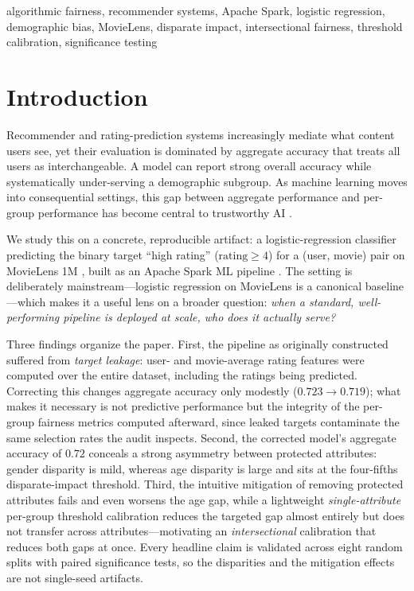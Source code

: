 \documentclass[conference]{IEEEtran}
\begin{document}
\begin{IEEEkeywords}
algorithmic fairness, recommender systems, Apache Spark, logistic regression,
demographic bias, MovieLens, disparate impact, intersectional fairness,
threshold calibration, significance testing
\end{IEEEkeywords}

\section{Introduction}
Recommender and rating-prediction systems increasingly mediate what content users
see, yet their evaluation is dominated by aggregate accuracy that treats all users
as interchangeable. A model can report strong overall accuracy while systematically
under-serving a demographic subgroup. As machine learning moves into consequential
settings, this gap between aggregate performance and per-group performance has
become central to trustworthy AI \cite{mehrabi2021survey,barocas2016big}.

We study this on a concrete, reproducible artifact: a logistic-regression classifier
predicting the binary target ``high rating'' ($\text{rating}\geq 4$) for a
(user, movie) pair on MovieLens 1M \cite{harper2015movielens}, built as an Apache
Spark ML pipeline \cite{meng2016mllib,zaharia2016spark}. The setting is deliberately
mainstream---logistic regression on MovieLens is a canonical baseline---which makes
it a useful lens on a broader question: \emph{when a standard, well-performing
pipeline is deployed at scale, who does it actually serve?}

Three findings organize the paper. First, the pipeline as originally constructed
suffered from \emph{target leakage}: user- and movie-average rating features were
computed over the entire dataset, including the ratings being predicted. Correcting
this changes aggregate accuracy only modestly ($0.723\rightarrow0.719$); what makes
it necessary is not predictive performance but the integrity of the per-group
fairness metrics computed afterward, since leaked targets contaminate the same
selection rates the audit inspects. Second, the corrected model's aggregate accuracy
of $0.72$ conceals a strong asymmetry between protected attributes: gender disparity
is mild, whereas age disparity is large and sits at the four-fifths disparate-impact
threshold. Third, the intuitive mitigation of removing protected attributes fails
and even worsens the age gap, while a lightweight \emph{single-attribute} per-group threshold
calibration reduces the targeted gap almost entirely but does not transfer across
attributes---motivating an \emph{intersectional} calibration that reduces both gaps at
once. Every headline claim is validated across eight random splits with paired
significance tests, so the disparities and the mitigation effects are not single-seed
artifacts.
\end{document}
